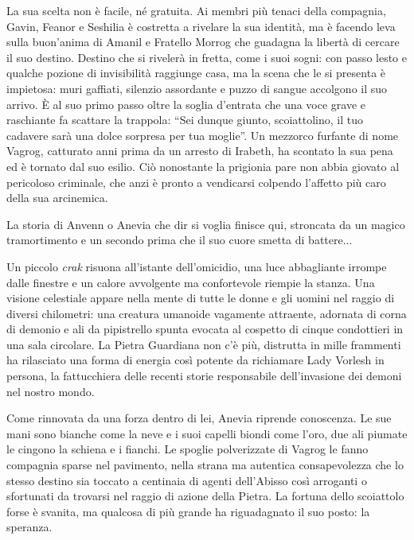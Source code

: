 La sua scelta non \`e facile, n\'e gratuita. Ai membri pi\`u tenaci della compagnia, Gavin, Feanor e Seshilia \`e costretta a rivelare la sua identit\`a, ma \`e facendo leva sulla buon'anima di Amanil e Fratello Morrog che guadagna la  libert\`a di cercare il suo destino. Destino che si riveler\`a in fretta, come i suoi sogni: con passo lesto e qualche pozione di invisibilit\`a raggiunge casa, ma la scena che le si presenta \`e impietosa: muri gaffiati, silenzio assordante e puzzo di sangue accolgono il suo arrivo. \`E al suo primo passo oltre la soglia d'entrata che una voce grave e raschiante fa scattare la trappola: ``Sei dunque giunto, scoiattolino, il tuo cadavere sar\`a una dolce sorpresa per tua moglie''. Un mezzorco furfante di nome Vagrog, catturato anni prima da un arresto di Irabeth, ha scontato la sua pena ed \`e tornato dal suo esilio. Ci\`o nonostante la prigionia pare non abbia giovato al pericoloso criminale, che anzi \`e pronto a vendicarsi colpendo l'affetto pi\`u caro della sua arcinemica.

La storia di Anvenn o Anevia che dir si voglia finisce qui, stroncata da un magico tramortimento e un secondo prima che il suo cuore smetta di battere... 

Un piccolo \emph{crak} risuona all'istante dell'omicidio, una luce abbagliante irrompe dalle finestre e un calore avvolgente ma confortevole riempie la stanza. Una visione celestiale appare nella mente di tutte le donne e gli uomini nel raggio di diversi chilometri: una creatura umanoide vagamente attraente, adornata di corna di demonio e ali da pipistrello spunta evocata al cospetto di cinque condottieri in una sala circolare. La Pietra Guardiana non c'\`e pi\`u, distrutta in mille frammenti ha rilasciato una forma di energia cos\`i potente da richiamare Lady Vorlesh in persona, la fattucchiera delle recenti storie responsabile dell'invasione dei demoni nel nostro mondo. 

Come rinnovata da una forza dentro di lei, Anevia riprende conoscenza. Le sue mani sono bianche come la neve e i suoi capelli biondi come l'oro, due ali piumate le cingono la schiena e i fianchi. Le spoglie polverizzate di Vagrog le fanno compagnia sparse nel pavimento, nella strana ma autentica consapevolezza che lo stesso destino sia toccato a centinaia di agenti dell'Abisso cos\`i arroganti o sfortunati da trovarsi nel raggio di azione della Pietra. La fortuna dello scoiattolo forse \`e svanita, ma qualcosa di pi\`u grande ha riguadagnato il suo posto: la speranza.
